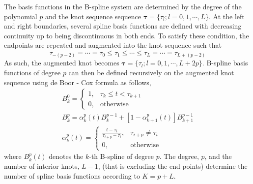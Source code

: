 The basis functions in the B-spline system are determined by the degree of the polynomial $p$ and the knot sequence sequence $\boldsymbol{\tau}=\{\tau_l; l = 0,1,\cdots, L\}$.
At the left and right boundaries, several spline basis functions are defined with decreasing continuity up to being discontinuous in both ends.
To satisfy these condition, the endpoints are repeated and augmented into the knot sequence such that
\begin{equation}
	\tau_{-(p-2)} = \cdots = \tau_{0} \leq \tau_{1} \leq \cdots \leq \tau_{L} = \cdots = \tau_{L+(p-2)} 
\label{eq:augmented_knots}
\end{equation}
As such, the augmented knot becomes $\boldsymbol{\tau}=\{\tau_l; l = 0,1,\cdots, L + 2p\}$.
B-spline basis functions of degree $p$ can then be defined recursively on the augmented knot sequence using de Boor - Cox formula as follows, 
\begin{equation}
	\begin{split}
		B^0_k = 
			\begin{cases}
				1, & \tau_k \leq t < \tau_{k+1} \\
			0, & \text{otherwise}
	\end{cases} \\
	B^p_k =  \alpha^p_k (t) B^{p-1}_k + \left[1 - \alpha^p_{k+1} (t)\right] B^{p-1}_{k+1} \\
	\alpha^p_k (t) =
	\begin{cases}
				\frac{t - \tau_i}{\tau_{i+p}-\tau_i}, & \tau_{i+p} \neq \tau_i \\
			  0, & \text{otherwise}
	\end{cases}
	\end{split} 
\label{eq:}
\end{equation}
where $B_k^p (t)$ denotes the $k$-th B-spline of degree $p$.
The degree, $p$, and the number of interior knots, $L-1$, (that is excluding the end points) determine the number of spline basis functions according to $K = p + L$.

